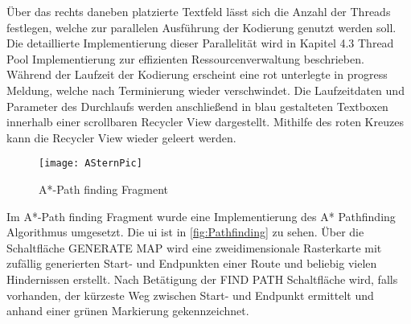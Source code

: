 Über das rechts daneben platzierte Textfeld lässt sich die Anzahl der Threads festlegen, welche zur parallelen Ausführung der Kodierung genutzt werden soll. Die detaillierte Implementierung dieser Parallelität wird in Kapitel 4.3 \glqq Thread Pool Implementierung zur effizienten Ressourcenverwaltung\grqq{} beschrieben. Während der Laufzeit der Kodierung erscheint eine rot unterlegte \glqq in progress\grqq{} Meldung, welche nach Terminierung wieder verschwindet. Die Laufzeitdaten und Parameter des Durchlaufs werden anschließend in blau gestalteten Textboxen innerhalb einer scrollbaren Recycler View dargestellt. Mithilfe des roten Kreuzes kann die Recycler View wieder geleert werden.
\begin{figure}[H]
\begin{center}
	\texttt{[image: ASternPic]}
	\caption{A*-Path finding Fragment}
	\label{fig:Pathfinding} 
\end{center}
\end{figure}
Im A*-Path finding Fragment wurde eine Implementierung des A* Pathfinding Algorithmus umgesetzt. Die \ac{ui} ist in \autoref{fig:Pathfinding} zu sehen. Über die Schaltfläche \glqq GENERATE MAP\grqq{} wird eine zweidimensionale Rasterkarte mit zufällig generierten Start- und Endpunkten einer Route und beliebig vielen Hindernissen erstellt. Nach Betätigung der \glqq FIND PATH\grqq{} Schaltfläche wird, falls vorhanden, der kürzeste Weg zwischen Start- und Endpunkt ermittelt und anhand einer grünen Markierung gekennzeichnet.

